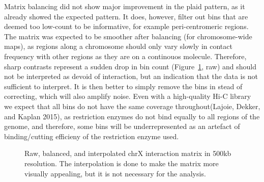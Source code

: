 \documentclass[
  11pt,
  a4paper,
]{scrbook}
\begin{document}
Matrix balancing did not show major improvement in the plaid pattern, as
it already showed the expected pattern. It does, however, filter out
bins that are deemed too low-count to be informative, for example
peri-centromeric regions. The matrix was expected to be smoother after
balancing (for chromosome-wide maps), as regions along a chromosome
should only vary slowly in contact frequency with other regions as they
are on a continouos molecule. Therefore, sharp contrasts represent a
sudden drop in bin count (Figure~\ref{fig-rs-chrx-raw-balanced-cgi},
raw) and should not be interpreted as devoid of interaction, but an
indication that the data is not sufficient to interpret. It is then
better to simply remove the bins in stead of correcting, which will also
amplify noise. Even with a high-quality Hi-C library we expect that all
bins do not have the same coverage throughout(Lajoie, Dekker, and Kaplan
2015), as restriction enzymes do not bind equally to all regions of the
genome, and therefore, some bins will be underrepresented as an artefact
of binding/cutting efficieny of the restriction enzyme used.

\begin{figure}[H]


\caption{\label{fig-rs-chrx-raw-balanced-cgi}Raw, balanced, and
interpolated chrX interaction matrix in 500kb resolution. The
interpolation is done to make the matrix more visually appealing, but it
is not necessary for the analysis.}

\end{figure}%
\end{document}
